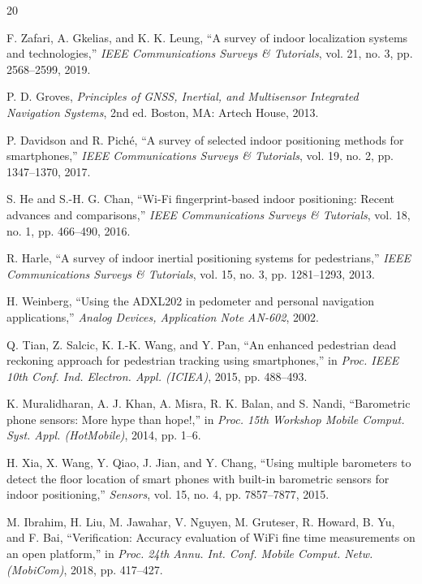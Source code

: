 \documentclass[journal,twocolumn]{IEEEtran}
\begin{document}
\begin{thebibliography}{20}

F. Zafari, A. Gkelias, and K. K. Leung, ``A survey of indoor localization systems and technologies,'' \textit{IEEE Communications Surveys \& Tutorials}, vol. 21, no. 3, pp. 2568--2599, 2019.

P. D. Groves, \textit{Principles of GNSS, Inertial, and Multisensor Integrated Navigation Systems}, 2nd ed. Boston, MA: Artech House, 2013.

P. Davidson and R. Pich\'{e}, ``A survey of selected indoor positioning methods for smartphones,'' \textit{IEEE Communications Surveys \& Tutorials}, vol. 19, no. 2, pp. 1347--1370, 2017.

S. He and S.-H. G. Chan, ``Wi-Fi fingerprint-based indoor positioning: Recent advances and comparisons,'' \textit{IEEE Communications Surveys \& Tutorials}, vol. 18, no. 1, pp. 466--490, 2016.

R. Harle, ``A survey of indoor inertial positioning systems for pedestrians,'' \textit{IEEE Communications Surveys \& Tutorials}, vol. 15, no. 3, pp. 1281--1293, 2013.

H. Weinberg, ``Using the ADXL202 in pedometer and personal navigation applications,'' \textit{Analog Devices, Application Note AN-602}, 2002.

Q. Tian, Z. Salcic, K. I.-K. Wang, and Y. Pan, ``An enhanced pedestrian dead reckoning approach for pedestrian tracking using smartphones,'' in \textit{Proc. IEEE 10th Conf. Ind. Electron. Appl. (ICIEA)}, 2015, pp. 488--493.

K. Muralidharan, A. J. Khan, A. Misra, R. K. Balan, and S. Nandi, ``Barometric phone sensors: More hype than hope!,'' in \textit{Proc. 15th Workshop Mobile Comput. Syst. Appl. (HotMobile)}, 2014, pp. 1--6.

H. Xia, X. Wang, Y. Qiao, J. Jian, and Y. Chang, ``Using multiple barometers to detect the floor location of smart phones with built-in barometric sensors for indoor positioning,'' \textit{Sensors}, vol. 15, no. 4, pp. 7857--7877, 2015.

M. Ibrahim, H. Liu, M. Jawahar, V. Nguyen, M. Gruteser, R. Howard, B. Yu, and F. Bai, ``Verification: Accuracy evaluation of WiFi fine time measurements on an open platform,'' in \textit{Proc. 24th Annu. Int. Conf. Mobile Comput. Netw. (MobiCom)}, 2018, pp. 417--427.


\end{thebibliography}
\end{document}
